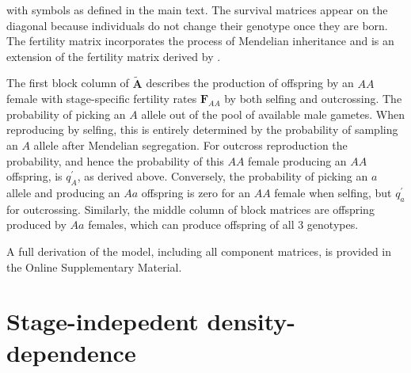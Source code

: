 \documentclass[11pt]{article}
\def\mbf#1{\mathbf{#1}}
\begin{document}
\noindent with symbols as defined in the main text. The survival matrices appear on the diagonal because individuals do not change their genotype once they are born. The fertility matrix incorporates the process of Mendelian inheritance and is an extension of the fertility matrix derived by \citet{deVriesCaswell2019a}.

The first block column of $\tilde{\mbf{A}}$ describes the production of offspring by an $AA$ female with stage-specific fertility rates $\mbf{F}_{AA}$ by both selfing and outcrossing. The probability of picking an $A$ allele out of the pool of available male gametes. When reproducing by selfing, this is entirely determined by the probability of sampling an $A$ allele after Mendelian segregation. For outcross reproduction the probability, and hence the probability of this $AA$ female producing an $AA$ offspring, is $q^{\prime}_{A}$, as derived above. Conversely, the probability of picking an $a$ allele and producing an $Aa$ offspring is zero for an $AA$ female when selfing, but $q^{\prime}_a$ for outcrossing. Similarly, the middle column of block matrices are offspring produced by $Aa$ females, which can produce offspring of all $3$ genotypes.

A full derivation of the model, including all component matrices, is provided in the Online Supplementary Material. 


\section{Stage-indepedent density-dependence}\label{App:DensDep}
\renewcommand{\theequation}{B\arabic{equation}}
\renewcommand{\thetable}{B\arabic{table}}
\renewcommand{\thefigure}{B\arabic{figure}}
\setcounter{figure}{0}  %
\setcounter{equation}{0}  %
\setcounter{table}{0}  %
\end{document}
